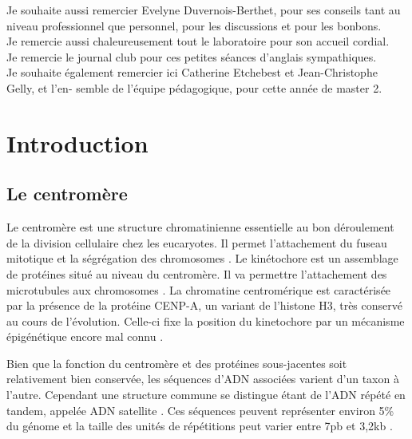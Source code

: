 \documentclass[12pt,a4paper]{article}
\begin{document}
Je souhaite aussi remercier Evelyne Duvernois-Berthet, pour ses conseils tant au niveau professionnel
que personnel, pour les discussions et pour les bonbons.\\

Je remercie aussi chaleureusement tout le laboratoire pour son accueil cordial.\\

Je remercie le journal club pour ces petites séances d'anglais sympathiques.\\

Je souhaite également remercier ici Catherine Etchebest et Jean-Christophe Gelly, et l’en-
semble de l’équipe pédagogique, pour cette année de master 2.\\

\thispagestyle{empty}

\newpage
\tableofcontents
\setcounter{page}{0}
\thispagestyle{empty}
\newpage 

\section{Introduction}
\subsection{Le centromère}
Le centromère est une structure chromatinienne essentielle au bon déroulement de la division cellulaire chez les eucaryotes. Il permet l'attachement du fuseau mitotique et la ségrégation des chromosomes \cite{Cleveland2003}.  Le kinétochore est un assemblage de protéines situé au niveau du centromère.  Il va permettre l'attachement des  microtubules aux chromosomes \cite{Santaguida2009}. La chromatine centromérique est caractérisée par la présence de la protéine CENP-A, un variant de l'histone H3, très conservé au cours de l'évolution. Celle-ci fixe la position du kinetochore par un mécanisme épigénétique encore mal connu \cite{Sullivan1994}.

Bien que la fonction du centromère et des protéines sous-jacentes soit relativement bien conservée, les séquences d'ADN associées varient d'un taxon à l'autre. Cependant une structure commune se distingue étant de l'ADN répété en tandem, appelée ADN satellite \cite{Henikoff2001}. Ces séquences peuvent représenter environ 5\% du génome et la taille des unités de répétitions peut varier entre 7pb et 3,2kb \cite{Cellamare2009}.
\end{document}
